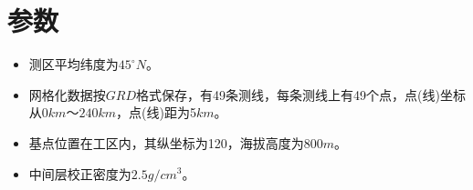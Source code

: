 \section{参数}

\begin{itemize}
\item 测区平均纬度为$45^{\circ}N$。
\item 网格化数据按$GRD$格式保存，有49条测线，每条测线上有49个点，点(线)坐标从$0km～240km$，点(线)距为5$km$。
\item 基点位置在工区内，其纵坐标为120，海拔高度为800$m$。
\item 中间层校正密度为$2.5g/cm^3$。

\end{itemize}